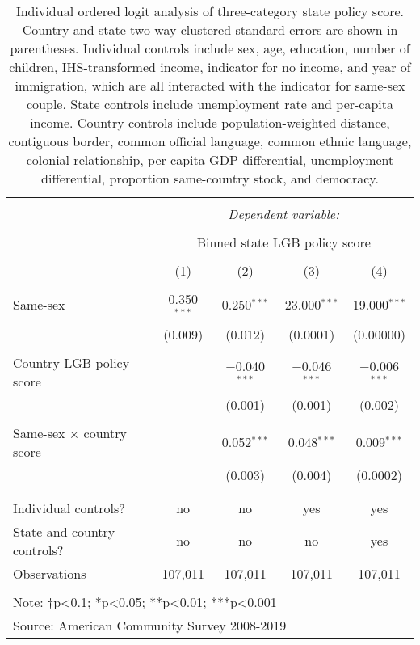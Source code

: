 \documentclass[
  11pt,
]{article}
\begin{document}
\begin{table}[!htbp] \centering 
  \caption{Individual ordered logit analysis of three-category state policy score. Country and state two-way clustered standard errors are shown in parentheses. Individual controls include sex, age, education, number of children, IHS-transformed income, indicator for no income, and year of immigration, which are all interacted with the indicator for same-sex couple. State controls include unemployment rate and per-capita income. Country controls include population-weighted distance, contiguous border, common official language, common ethnic language, colonial relationship, per-capita GDP differential, unemployment differential, proportion same-country stock, and democracy.} 
  \label{tab:ord} 
\begin{tabular}{@{\extracolsep{5pt}}lcccc} 
\\[-1.8ex]\hline 
\hline \\[-1.8ex] 
 & \multicolumn{4}{c}{\textit{Dependent variable:}} \\ 
\cline{2-5} 
\\[-1.8ex] & \multicolumn{4}{c}{Binned state LGB policy score} \\ 
\\[-1.8ex] & (1) & (2) & (3) & (4)\\ 
\hline \\[-1.8ex] 
 Same-sex & 0.350$^{***}$ & 0.250$^{***}$ & 23.000$^{***}$ & 19.000$^{***}$ \\ 
  & (0.009) & (0.012) & (0.0001) & (0.00000) \\ 
  & & & & \\ 
 Country LGB policy score &  & $-$0.040$^{***}$ & $-$0.046$^{***}$ & $-$0.006$^{***}$ \\ 
  &  & (0.001) & (0.001) & (0.002) \\ 
  & & & & \\ 
 Same-sex × country score &  & 0.052$^{***}$ & 0.048$^{***}$ & 0.009$^{***}$ \\ 
  &  & (0.003) & (0.004) & (0.0002) \\ 
  & & & & \\ 
\hline \\[-1.8ex] 
Individual controls? & no & no & yes & yes \\ 
State and country controls? & no & no & no & yes \\ 
Observations & 107,011 & 107,011 & 107,011 & 107,011 \\ 
\hline 
\hline \\[-1.8ex] 
\multicolumn{5}{l}{Note: †p<0.1; *p<0.05; **p<0.01; ***p<0.001} \\ 
\multicolumn{5}{l}{Source: American Community Survey 2008-2019} \\ 
\end{tabular} 
\end{table}
\end{document}
